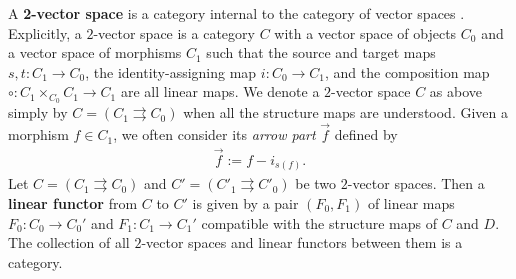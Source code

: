 \documentclass[a4paper,reqno,10pt]{amsart}
\theoremstyle{plain}
\theoremstyle{definition}
\theoremstyle{remark}
\begin{document}
A {\bf 2-vector space} is a category internal to the category of vector spaces \cite{baez-crans}. Explicitly, a $2$-vector space is a category $C$ with a vector space of objects $C_0$ and a vector space of morphisms $C_1$ such that the source and target maps $s, t: C_1 \rightarrow C_0$, the identity-assigning map $i: C_0 \rightarrow C_1$, and the composition map $\circ: C_1 \times_{C_0} C_1 \rightarrow C_1$ are all linear maps. We denote a $2$-vector space $C$ as above simply by $C= (C_1 \rightrightarrows C_0)$ when all the structure maps are understood. Given a morphism $f \in C_1$, we often consider its {\em arrow part} $\overrightarrow{f}$ defined by
\begin{align*}
    \overrightarrow{f} := f - i_{s (f)}.
\end{align*}
Let $C= (C_1 \rightrightarrows C_0)$ and $C'= (C'_1 \rightrightarrows C'_0)$ be two $2$-vector spaces. Then a {\bf linear functor} from $C$ to $C'$ is given by a pair $(F_0, F_1)$ of linear maps $F_0 : C_0 \rightarrow C_0'$ and $F_1 : C_1 \rightarrow C_1'$ compatible with the structure maps of $C$ and $D$. The collection of all $2$-vector spaces and linear functors between them is a category.
\end{document}
